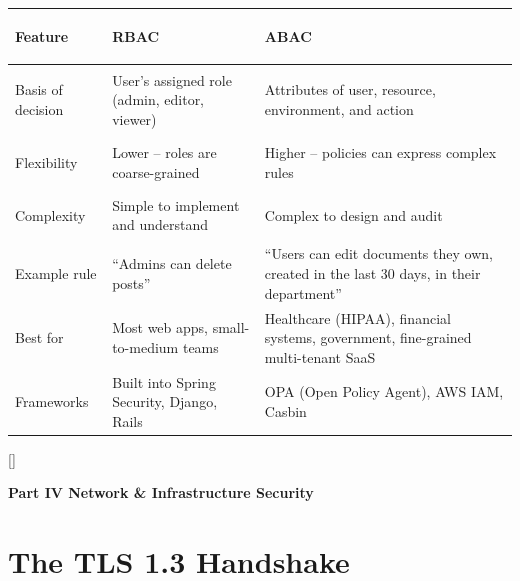 \documentclass[11pt, letterpaper]{article}
\newcommand{\orangesections}{%
  \titleformat{\section}{\large\bfseries\color{sectionorange}}{}{0em}{}[\color{sectionorange}\titlerule]%
  \titleformat{\subsection}{\normalsize\bfseries\color{sectionorange!80!black}}{}{0em}{}%
}
\newcommand{\partbanner}[3]{%
  \begin{tcolorbox}[colback=#1, colframe=#2, boxrule=1.2pt, arc=4pt,
    left=8pt, right=8pt, top=6pt, bottom=6pt]
    \begin{center}{\LARGE\bfseries #3}\end{center}
  \end{tcolorbox}%
}
\begin{document}
\noindent
{\renewcommand{\arraystretch}{1.6}
\begin{tabularx}{\textwidth}{>{\bfseries\raggedright\arraybackslash}p{3.5cm}
                              >{\raggedright\arraybackslash}X
                              >{\raggedright\arraybackslash}X}
\toprule
\rowcolor{tableheader}
\textbf{Feature} & \textbf{RBAC} & \textbf{ABAC} \\
\midrule
\rowcolor{rowA}  Basis of decision & User's assigned role (admin, editor, viewer) & Attributes of user, resource, environment, and action \\
\rowcolor{rowB}  Flexibility & Lower -- roles are coarse-grained & Higher -- policies can express complex rules \\
\rowcolor{rowA}  Complexity & Simple to implement and understand & Complex to design and audit \\
\rowcolor{rowB}  Example rule & ``Admins can delete posts'' & ``Users can edit documents they own, created in the last 30 days, in their department'' \\
\rowcolor{rowA}  Best for & Most web apps, small-to-medium teams & Healthcare (HIPAA), financial systems, government, fine-grained multi-tenant SaaS \\
\rowcolor{rowB}  Frameworks & Built into Spring Security, Django, Rails & OPA (Open Policy Agent), AWS IAM, Casbin \\
\bottomrule
\end{tabularx}}

\newpage

\orangesections
{}
\partbanner{part4bg}{sectionorange}{Part IV \quad Network \& Infrastructure Security}

\vspace{8pt}

\section*{The TLS 1.3 Handshake}
\end{document}
